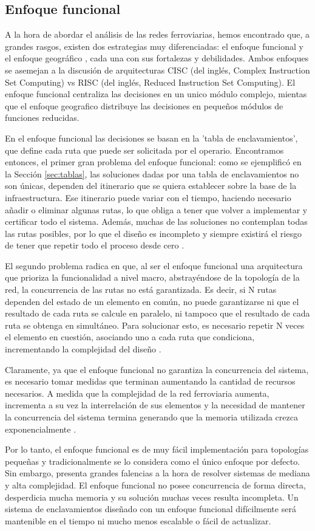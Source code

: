 \subsection{Enfoque funcional}

    A la hora de abordar el análisis de las redes ferroviarias, hemos encontrado que, a grandes rasgos, existen dos estrategias muy diferenciadas: el enfoque funcional y el enfoque geográfico \cite{Paper_9,Paper_204}, cada una con sus fortalezas y debilidades. Ambos enfoques se asemejan a la discusión de arquitecturas CISC (del inglés, Complex Instruction Set Computing) vs RISC (del inglés, Reduced Instruction Set Computing). El enfoque funcional centraliza las decisiones en un unico módulo complejo, mientas que el enfoque geografico distribuye las decisiones en pequeños módulos de funciones reducidas.

    En el enfoque funcional las decisiones se basan en la 'tabla de enclavamientos', que define cada ruta que puede ser solicitada por el operario. Encontramos entonces, el primer gran problema del enfoque funcional: como se ejemplificó en la Sección \ref{sec:tablas}, las soluciones dadas por una tabla de enclavamientos no son únicas, dependen del itinerario que se quiera establecer sobre la base de la infraestructura. Ese itinerario puede variar con el tiempo, haciendo necesario añadir o eliminar algunas rutas, lo que obliga a tener que volver a implementar y certificar todo el sistema. Además, muchas de las soluciones no contemplan todas las rutas posibles, por lo que el diseño es incompleto y siempre existirá el riesgo de tener que repetir todo el proceso desde cero \cite{Paper_204}.

    El segundo problema radica en que, al ser el enfoque funcional una arquitectura que prioriza la funcionalidad a nivel macro, abstrayéndose de la topología de la red, la concurrencia de las rutas no está garantizada. Es decir, si N rutas dependen del estado de un elemento en común, no puede garantizarse ni que el resultado de cada ruta se calcule en paralelo, ni tampoco que el resultado de cada ruta se obtenga en simultáneo. Para solucionar esto, es necesario repetir N veces el elemento en cuestión, asociando uno a cada ruta que condiciona, incrementando la complejidad del diseño \cite{Paper_204}. 
    
    Claramente, ya que el enfoque funcional no garantiza la concurrencia del sistema, es necesario tomar medidas que terminan aumentando la cantidad de recursos necesarios. A medida que la complejidad de la red ferroviaria aumenta, incrementa a su vez la interrelación de sus elementos y la necesidad de mantener la concurrencia del sistema termina generando que la memoria utilizada crezca exponencialmente \cite{Paper_204}.

    Por lo tanto, el enfoque funcional es de muy fácil implementación para topologías pequeñas y tradicionalmente se lo considera como el único enfoque por defecto. Sin embargo, presenta grandes falencias a la hora de resolver sistemas de mediana y alta complejidad. El enfoque funcional no posee concurrencia de forma directa, desperdicia mucha memoria y su solución muchas veces resulta incompleta. Un sistema de enclavamientos diseñado con un enfoque funcional difícilmente será mantenible en el tiempo ni mucho menos escalable o fácil de actualizar.